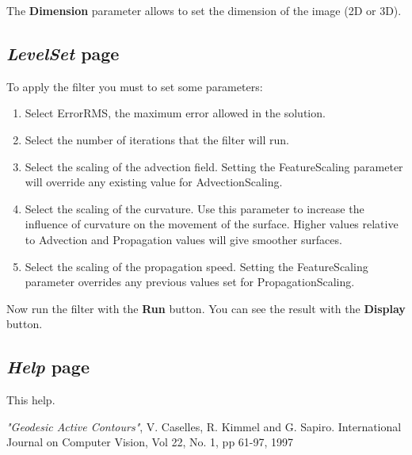 \documentclass{article}
\begin{document}
The {\bf Dimension} parameter allows to set the dimension of the image (2D or 3D).

\subsection{\emph{LevelSet} page}
To apply the filter you must to set some parameters:
\begin{enumerate}
  \item Select ErrorRMS, the maximum error allowed in the solution.
  \item Select the number of iterations that the filter will run. 
  \item Select the scaling of the advection field. Setting the FeatureScaling parameter will override any existing value for AdvectionScaling.
  \item Select the scaling of the curvature. Use this parameter to increase the influence of curvature on the movement of the surface. Higher values relative to Advection and Propagation values will give smoother surfaces.
  \item Select the scaling of the propagation speed. Setting the FeatureScaling parameter overrides any previous values set for PropagationScaling.
\end{enumerate}
Now run the filter with the {\bf Run} button.
You can see the result with the {\bf Display} button.

\subsection{\emph{Help} page}
This help.

\begin{thebibliography}{1}
 {\em "Geodesic Active Contours"}, V. Caselles, R. Kimmel and G. Sapiro. International Journal on Computer Vision, Vol 22, No. 1, pp 61-97, 1997 
\end{thebibliography}
\end{document}
